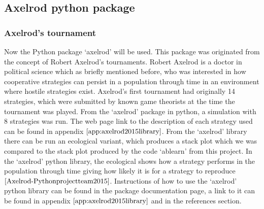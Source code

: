 \subsection{Axelrod python package}
\subsubsection{Axelrod's tournament}
Now the Python package `axelrod' will be used. This package was originated from the concept of Robert Axelrod's tournaments. Robert Axelrod is a doctor in political science which as briefly mentioned before, who was interested in how cooperative strategies can persist in a population through time in an environment where hostile strategies exist.
Axelrod’s first tournament had originally 14 strategies, which were submitted by known game theorists at the time the tournament was played. From the `axelrod' package in python, a simulation with 8 strategies was run. The web page link to the description of each strategy used can be found in appendix $\ref{app:axelrod2015library}$.
From the `axelrod' library there can be run an ecological variant, which produces a stack plot which we was compared to the stack plot produced by the code `ablearn' from this project. In the `axelrod' python library, the ecological shows how a strategy performs in the population through time giving how likely it is for a strategy to reproduce $\cite{Axelrod-Pythonprojectteam2015}$. Instructions of how to use the `axelrod' python library can be found in the package documentation page, a link to it can be found in appendix $\ref{app:axelrod2015library}$ and in the references section.

